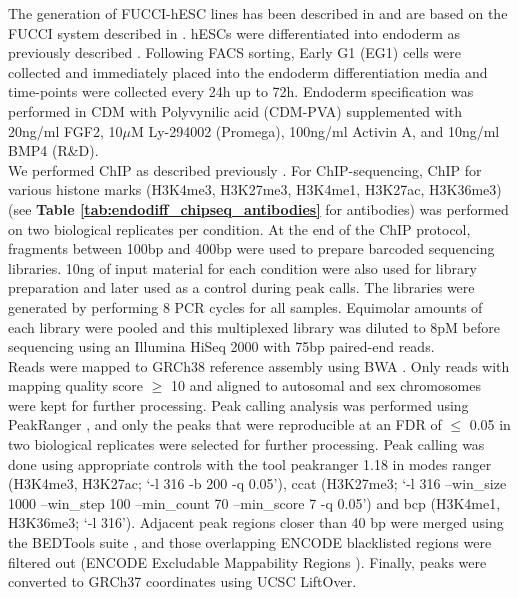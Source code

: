 The generation of FUCCI-hESC lines has been described in \cite{pauklin2013cell} and are based on the FUCCI system described in \cite{sakaue2008visualizing}. 
hESCs were differentiated into endoderm as previously described \cite{vallier2009early}. 
Following FACS sorting, Early G1 (EG1) cells were collected and immediately placed into the endoderm differentiation media and time-points were collected every 24h up to 72h.
Endoderm specification was performed in CDM with Polyvynilic acid (CDM-PVA) supplemented with 20ng/ml FGF2, 10$\mu$M Ly-294002 (Promega), 100ng/ml Activin A, and 10ng/ml BMP4 (R\&D). \\

We performed ChIP as described previously \cite{pauklin2016initiation}. 
For ChIP-sequencing, ChIP for various histone marks (H3K4me3, H3K27me3, H3K4me1, H3K27ac, H3K36me3) (see \textbf{Table \ref{tab:endodiff_chipseq_antibodies}} for antibodies) was performed on two biological replicates per condition. 
At the end of the ChIP protocol, fragments between 100bp and 400bp were used to prepare barcoded sequencing libraries. 
10ng of input material for each condition were also used for library preparation and later used as a control during peak calls. 
The libraries were generated by performing 8 PCR cycles for all samples. 
Equimolar amounts of each library were pooled and this multiplexed library was diluted to 8pM before sequencing using an Illumina HiSeq 2000 with 75bp paired-end reads. \\

Reads were mapped to GRCh38 reference assembly using BWA \cite{li2009fast}. 
Only reads with mapping quality score $\geq$ 10 and aligned to autosomal and sex chromosomes were kept for further processing. 
Peak calling analysis \cite{bailey2013practical} was performed using PeakRanger \cite{feng2011peakranger}, and only the peaks that were reproducible at an FDR of $\leq$ 0.05 in two biological replicates were selected for further processing. 
Peak calling was done using appropriate controls with the tool peakranger 1.18 in modes ranger (H3K4me3, H3K27ac; `-l 316 -b 200 -q 0.05'), ccat (H3K27me3; ‘-l 316 --win\_size 1000 --win\_step 100 --min\_count 70 --min\_score 7 -q 0.05’) and bcp (H3K4me1, H3K36me3; ‘-l 316’). 
Adjacent peak regions closer than 40 bp were merged using the BEDTools suite \cite{quinlan2010bedtools}, and those overlapping ENCODE blacklisted regions were filtered out (ENCODE Excludable Mappability Regions \cite{encode2012integrated}). 
Finally, peaks were converted to GRCh37 coordinates using UCSC LiftOver. 

